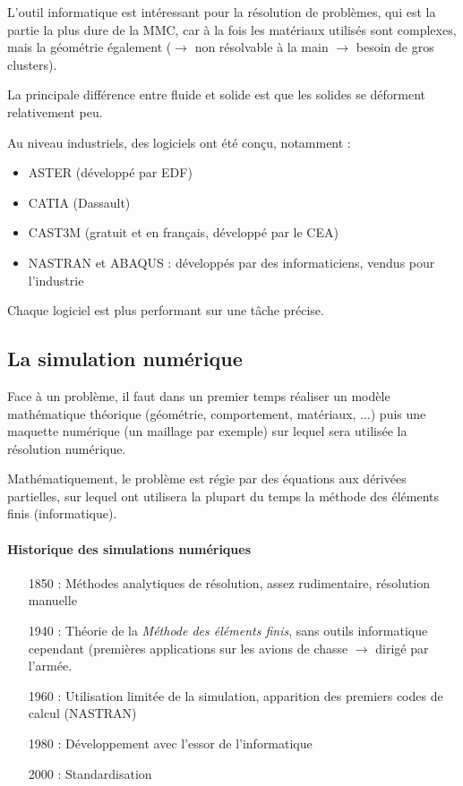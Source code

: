 \documentclass{article}
\begin{document}
L'outil informatique est intéressant pour la résolution de problèmes, qui est la partie la plus dure de la MMC, car à la fois les matériaux utilisés sont complexes, mais la géométrie également ($\to$ non résolvable à la main $\to$ besoin de gros clusters).

La principale différence entre fluide et solide est que les solides se déforment relativement peu.

Au niveau industriels, des logiciels ont été conçu, notamment :
\begin{itemize}
\item ASTER (développé par EDF)
\item CATIA (Dassault)
\item CAST3M (gratuit et en français, développé par le CEA)
\item NASTRAN et ABAQUS : développés par des informaticiens, vendus pour l'industrie
\end{itemize}
Chaque logiciel est plus performant sur une tâche précise.

\subsection{La simulation numérique}
Face à un problème, il faut dans un premier temps réaliser un modèle mathématique théorique (géométrie, comportement, matériaux, ...) puis une maquette numérique (un maillage par exemple) sur lequel sera utilisée la résolution numérique.

Mathématiquement, le problème est régie par des équations aux dérivées partielles, sur lequel ont utilisera la plupart du temps la méthode des éléments finis (informatique).
\bigskip

\paragraph{Historique des simulations numériques}
\begin{itemize}
\item[1850 :] Méthodes analytiques de résolution, assez rudimentaire, résolution manuelle
\item[1940 :] Théorie de la \emph{Méthode des éléments finis}, sans outils informatique cependant (premières applications sur les avions de chasse $\to$ dirigé par l'armée.
\item[1960 :] Utilisation limitée de la simulation, apparition des premiers codes de calcul (NASTRAN)
\item[1980 :] Développement avec l'essor de l'informatique
\item[2000 :] Standardisation
\end{itemize}
\bigskip
\end{document}
